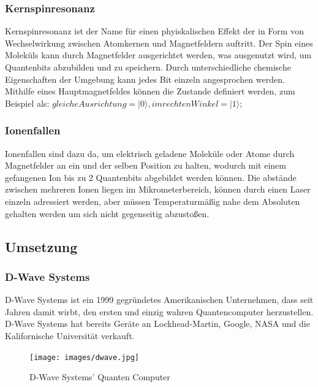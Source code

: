 \subsubsection{Kernspinresonanz}
\label{sec:kernspinresonanz}

Kernspinresonanz ist der Name für einen phyiskalischen Effekt der in Form von Wechselwirkung zwischen Atomkernen und Magnetfeldern auftritt. Der Spin eines Moleküls kann durch Magnetfelder ausgerichtet werden, was ausgenutzt wird, um Quantenbits abzubilden und zu speichern. Durch unterschiedliche chemische Eigenschaften der Umgebung kann jedes Bit einzeln angesprochen werden. Mithilfe eines Hauptmagnetfeldes können die Zustande definiert werden, zum Beispiel als: $gleiche Ausrichtung = |0\rangle, im rechten Winkel = |1\rangle$;

\subsubsection{Ionenfallen}
\label{sec:ionenfallen}

Ionenfallen sind dazu da, um elektrisch geladene Moleküle oder Atome durch Magnetfelder an ein und der selben Position zu halten, wodurch mit einem gefangenen Ion bis zu 2 Quantenbits abgebildet werden können. Die abstände zwischen mehreren Ionen liegen im Mikrometerbereich, können durch einen Laser einzeln adressiert werden, aber müssen Temperaturmäßig nahe dem Absoluten gehalten werden um sich nicht gegenseitig abzustoßen.

\subsection{Umsetzung}
\label{sec:umsetzung}

\subsubsection{D-Wave Systems}
\label{sec:dwave}

D-Wave Systems ist ein 1999 gegründetes Amerikanischen Unternehmen, dass seit Jahren damit wirbt, den ersten und einzig wahren Quantencomputer herzustellen. D-Wave Systems hat bereits Geräte an Lockhead-Martin, Google, NASA und die Kalifornische Universität verkauft.

\begin{figure}[!htb]
	\centering\texttt{[image: images/dwave.jpg]}
	\caption{D-Wave Systems' Quanten Computer}
	\label{dwave}
\end{figure}


